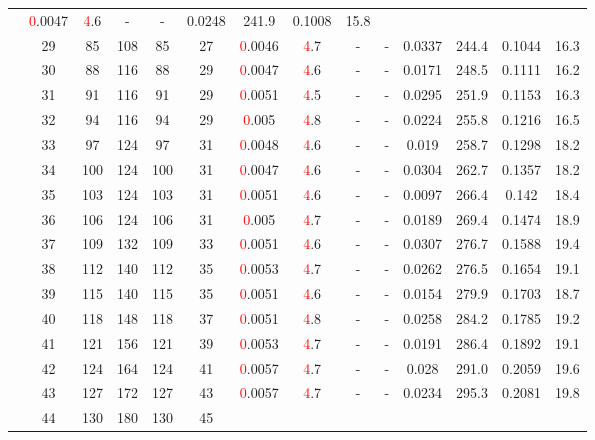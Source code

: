 \begin{table}[htb]
{\begin{tabular}{|c|c|c|c|c|c|c|c|c|c|c|c|c|c|}
 & \textcolor{red}0.0047 & \textcolor{red}4.6
 & - & -
 & 0.0248 & 241.9
 & 0.1008 & 15.8
 \\
 & 
29 & 85 & 108 & 85 & 27
 & \textcolor{red}0.0046 & \textcolor{red}4.7
 & - & -
 & 0.0337 & 244.4
 & 0.1044 & 16.3
 \\
 & 
30 & 88 & 116 & 88 & 29
 & \textcolor{red}0.0047 & \textcolor{red}4.6
 & - & -
 & 0.0171 & 248.5
 & 0.1111 & 16.2
 \\
 & 
31 & 91 & 116 & 91 & 29
 & \textcolor{red}0.0051 & \textcolor{red}4.5
 & - & -
 & 0.0295 & 251.9
 & 0.1153 & 16.3
 \\
 & 
32 & 94 & 116 & 94 & 29
 & \textcolor{red}0.005 & \textcolor{red}4.8
 & - & -
 & 0.0224 & 255.8
 & 0.1216 & 16.5
 \\
 & 
33 & 97 & 124 & 97 & 31
 & \textcolor{red}0.0048 & \textcolor{red}4.6
 & - & -
 & 0.019 & 258.7
 & 0.1298 & 18.2
 \\
 & 
34 & 100 & 124 & 100 & 31
 & \textcolor{red}0.0047 & \textcolor{red}4.6
 & - & -
 & 0.0304 & 262.7
 & 0.1357 & 18.2
 \\
 & 
35 & 103 & 124 & 103 & 31
 & \textcolor{red}0.0051 & \textcolor{red}4.6
 & - & -
 & 0.0097 & 266.4
 & 0.142 & 18.4
 \\
 & 
36 & 106 & 124 & 106 & 31
 & \textcolor{red}0.005 & \textcolor{red}4.7
 & - & -
 & 0.0189 & 269.4
 & 0.1474 & 18.9
 \\
 & 
37 & 109 & 132 & 109 & 33
 & \textcolor{red}0.0051 & \textcolor{red}4.6
 & - & -
 & 0.0307 & 276.7
 & 0.1588 & 19.4
 \\
 & 
38 & 112 & 140 & 112 & 35
 & \textcolor{red}0.0053 & \textcolor{red}4.7
 & - & -
 & 0.0262 & 276.5
 & 0.1654 & 19.1
 \\
 & 
39 & 115 & 140 & 115 & 35
 & \textcolor{red}0.0051 & \textcolor{red}4.6
 & - & -
 & 0.0154 & 279.9
 & 0.1703 & 18.7
 \\
 & 
40 & 118 & 148 & 118 & 37
 & \textcolor{red}0.0051 & \textcolor{red}4.8
 & - & -
 & 0.0258 & 284.2
 & 0.1785 & 19.2
 \\
 & 
41 & 121 & 156 & 121 & 39
 & \textcolor{red}0.0053 & \textcolor{red}4.7
 & - & -
 & 0.0191 & 286.4
 & 0.1892 & 19.1
 \\
 & 
42 & 124 & 164 & 124 & 41
 & \textcolor{red}0.0057 & \textcolor{red}4.7
 & - & -
 & 0.028 & 291.0
 & 0.2059 & 19.6
 \\
 & 
43 & 127 & 172 & 127 & 43
 & \textcolor{red}0.0057 & \textcolor{red}4.7
 & - & -
 & 0.0234 & 295.3
 & 0.2081 & 19.8
 \\
 & 
44 & 130 & 180 & 130 & 45

\end{tabular}}
\end{table}

